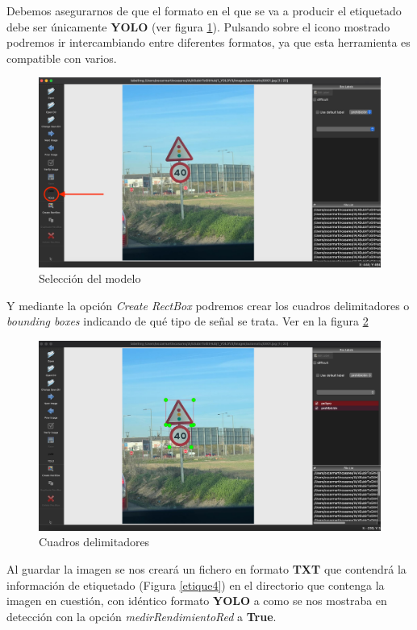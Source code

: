 Debemos asegurarnos de que el formato en el que se va a producir el etiquetado debe ser únicamente \textbf{YOLO} (ver figura \ref{etique2}). Pulsando sobre el icono mostrado podremos ir intercambiando entre diferentes formatos, ya que esta herramienta es compatible con varios.\\

\begin{figure}[H]
	\centering
	\includegraphics[width=\textwidth]{Imagenes/AnexoI_Manual/AA/etiquetado2.pdf}
	\caption{Selección del modelo}
	\label{etique2}
\end{figure}

Y mediante la opción \textit{Create RectBox} podremos crear los cuadros delimitadores o \textit{bounding boxes} indicando de qué tipo de señal se trata. Ver en la figura \ref{etique3}


\begin{figure}[H]
	\centering
	\includegraphics[width=\textwidth]{Imagenes/AnexoI_Manual/AA/etiquetado3.pdf}
	\caption{Cuadros delimitadores}
	\label{etique3}
\end{figure}

Al guardar la imagen se nos creará un fichero en formato \textbf{TXT} que contendrá la información de etiquetado (Figura \ref{etique4}) en el directorio que contenga la imagen en cuestión, con idéntico formato \textbf{YOLO} a como se nos mostraba en detección con la opción \textit{medirRendimientoRed} a \textbf{True}.

